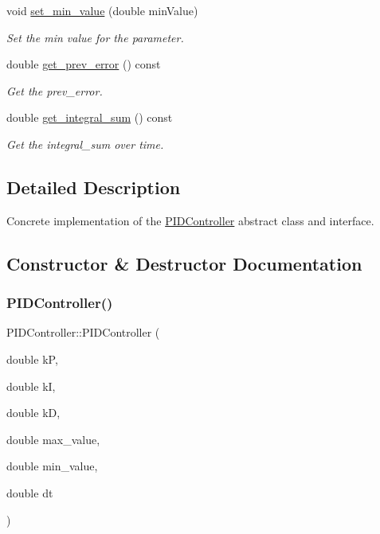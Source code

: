 \begin{DoxyCompactItemize}
void \hyperlink{classPIDController_a101d69b58ee371c45b1046dcd2bd58e7}{set\+\_\+min\+\_\+value} (double min\+Value)
\begin{DoxyCompactList}\small\item\em Set the min value for the parameter. \end{DoxyCompactList}\item 
double \hyperlink{classPIDController_a7617f92c27f92fa53e8c690a721e9965}{get\+\_\+prev\+\_\+error} () const
\begin{DoxyCompactList}\small\item\em Get the prev\+\_\+error. \end{DoxyCompactList}\item 
double \hyperlink{classPIDController_a9f5ea16a313044807fbd23135646c88e}{get\+\_\+integral\+\_\+sum} () const
\begin{DoxyCompactList}\small\item\em Get the integral\+\_\+sum over time. \end{DoxyCompactList}\end{DoxyCompactItemize}


\subsection{Detailed Description}
Concrete implementation of the \hyperlink{classPIDController}{P\+I\+D\+Controller} abstract class and interface. 

\subsection{Constructor \& Destructor Documentation}
\mbox{\label{classPIDController_aba84b9949f9e74bf038cc0a5a7ad7c67}} 
\subsubsection{\texorpdfstring{P\+I\+D\+Controller()}{PIDController()}}
{\footnotesize\ttfamily P\+I\+D\+Controller\+::\+P\+I\+D\+Controller (\begin{DoxyParamCaption}\item[{double}]{kP,  }\item[{double}]{kI,  }\item[{double}]{kD,  }\item[{double}]{max\+\_\+value,  }\item[{double}]{min\+\_\+value,  }\item[{double}]{dt }\end{DoxyParamCaption})}



